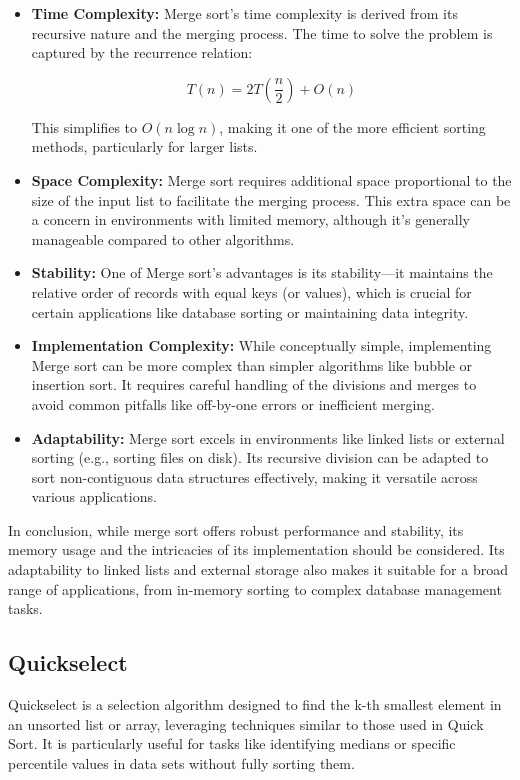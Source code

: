\documentclass[12pt]{book} %
\begin{document}
\begin{itemize}
    \item \textbf{Time Complexity:} Merge sort's time complexity is derived from its recursive nature and the merging process. The time to solve the problem is captured by the recurrence relation:

\[ T(n) = 2T\left(\frac{n}{2}\right) + O(n) \]

This simplifies to \( O(n \log n) \), making it one of the more efficient sorting methods, particularly for larger lists.

\item \textbf{Space Complexity:} Merge sort requires additional space proportional to the size of the input list to facilitate the merging process. This extra space can be a concern in environments with limited memory, although it's generally manageable compared to other algorithms.

\item \textbf{Stability:} One of Merge sort's advantages is its stability—it maintains the relative order of records with equal keys (or values), which is crucial for certain applications like database sorting or maintaining data integrity.

\item \textbf{Implementation Complexity:} While conceptually simple, implementing Merge sort can be more complex than simpler algorithms like bubble or insertion sort. It requires careful handling of the divisions and merges to avoid common pitfalls like off-by-one errors or inefficient merging.

\item \textbf{Adaptability:} Merge sort excels in environments like linked lists or external sorting (e.g., sorting files on disk). Its recursive division can be adapted to sort non-contiguous data structures effectively, making it versatile across various applications.
\end{itemize}

In conclusion, while merge sort offers robust performance and stability, its memory usage and the intricacies of its implementation should be considered. Its adaptability to linked lists and external storage also makes it suitable for a broad range of applications, from in-memory sorting to complex database management tasks.


\subsection{Quickselect}
Quickselect is a selection algorithm designed to find the k-th smallest element in an unsorted list or array, leveraging techniques similar to those used in Quick Sort. It is particularly useful for tasks like identifying medians or specific percentile values in data sets without fully sorting them.
\end{document}
